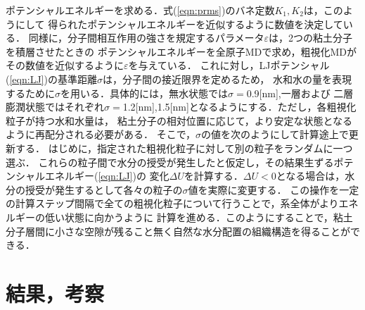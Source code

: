 ﻿\documentclass[11pt,a4j]{jarticle}
\begin{document}
ポテンシャルエネルギーを求める．式(\ref{eqn:prms})のバネ定数$K_1, K_2$は，このようにして
得られたポテンシャルエネルギーを近似するように数値を決定している．
同様に，分子間相互作用の強さを規定するパラメータ$\varepsilon$は，2つの粘土分子を積層させたときの
ポテンシャルエネルギーを全原子MDで求め，粗視化MDがその数値を近似するように$\varepsilon$を与えている．
これに対し，LJポテンシャル(\ref{eqn:LJ})の基準距離$\sigma$は，分子間の接近限界を定めるため，
水和水の量を表現するために$\sigma$を用いる．具体的には，無水状態では$\sigma=$0.9[nm],一層および
二層膨潤状態ではそれぞれ$\sigma=$1.2[nm],1.5[nm]となるようにする．ただし，各粗視化粒子が持つ水和水量は，
粘土分子の相対位置に応じて，より安定な状態となるように再配分される必要がある．
そこで，$\sigma$の値を次のようにして計算途上で更新する．
はじめに，指定された粗視化粒子に対して別の粒子をランダムに一つ選ぶ．
これらの粒子間で水分の授受が発生したと仮定し，その結果生ずるポテンシャルエネルギー(\ref{eqn:LJ})の
変化$\Delta U$を計算する．$\Delta U<0$となる場合は，水分の授受が発生するとして各々の粒子の$\sigma$値を実際に変更する．
この操作を一定の計算ステップ間隔で全ての粗視化粒子について行うことで，系全体がよりエネルギーの低い状態に向かうように
計算を進める．このようにすることで，粘土分子層間に小さな空隙が残ること無く自然な水分配置の組織構造を得ることができる．
\section{結果，考察}
\end{document}
